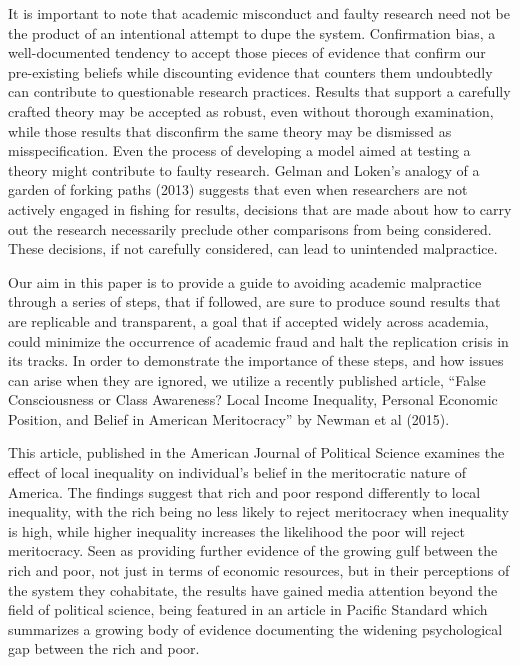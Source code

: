 It is important to note that academic misconduct and faulty research need not be the product of an intentional attempt to dupe the system. Confirmation bias, a well-documented tendency to accept those pieces of evidence that confirm our pre-existing beliefs while discounting evidence that counters them undoubtedly can contribute to questionable research practices. Results that support a carefully crafted theory may be accepted as robust, even without thorough examination, while those results that disconfirm the same theory may be dismissed as misspecification. Even the process of developing a model aimed at testing a theory might contribute to faulty research. Gelman and Loken’s analogy of a garden of forking paths (2013) suggests that even when researchers are not actively engaged in fishing for results, decisions that are made about how to carry out the research necessarily preclude other comparisons from being considered. These decisions, if not carefully considered, can lead to unintended malpractice.

Our aim in this paper is to provide a guide to avoiding academic malpractice through a series of steps, that if followed, are sure to produce sound results that are replicable and transparent, a goal that if accepted widely across academia, could minimize the occurrence of academic fraud and halt the replication crisis in its tracks. In order to demonstrate the importance of these steps, and how issues can arise when they are ignored, we utilize a recently published article, “False Consciousness or Class Awareness? Local Income Inequality, Personal Economic Position, and Belief in American Meritocracy” by Newman et al (2015).

This article, published in the American Journal of Political Science examines the effect of local inequality on individual’s belief in the meritocratic nature of America. The findings suggest that rich and poor respond differently to local inequality, with the rich being no less likely to reject meritocracy when inequality is high, while higher inequality increases the likelihood the poor will reject meritocracy. Seen as providing further evidence of the growing gulf between the rich and poor, not just in terms of economic resources, but in their perceptions of the system they cohabitate, the results have gained media attention beyond the field of political science, being featured in an article in Pacific Standard which summarizes a growing body of evidence documenting the widening psychological gap between the rich and poor.

